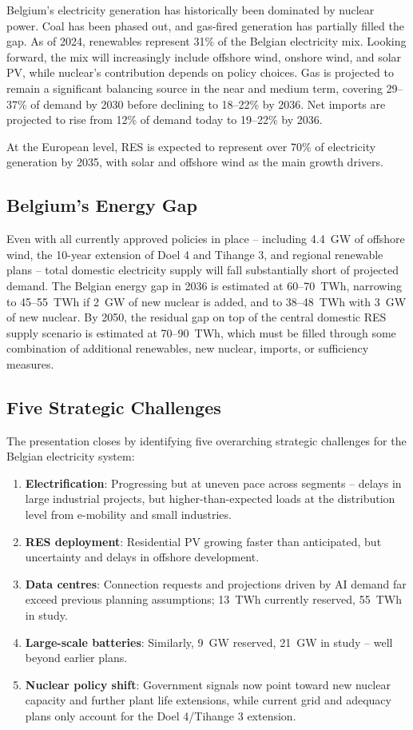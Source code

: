 Belgium's electricity generation has historically been dominated by nuclear power. Coal has been phased out, and gas-fired generation has partially filled the gap. As of 2024, renewables represent 31\% of the Belgian electricity mix. Looking forward, the mix will increasingly include offshore wind, onshore wind, and solar PV, while nuclear's contribution depends on policy choices. Gas is projected to remain a significant balancing source in the near and medium term, covering 29--37\% of demand by 2030 before declining to 18--22\% by 2036. Net imports are projected to rise from 12\% of demand today to 19--22\% by 2036.

At the European level, RES is expected to represent over 70\% of electricity generation by 2035, with solar and offshore wind as the main growth drivers.

\subsection{Belgium's Energy Gap}

Even with all currently approved policies in place -- including 4.4~GW of offshore wind, the 10-year extension of Doel 4 and Tihange 3, and regional renewable plans -- total domestic electricity supply will fall substantially short of projected demand. The Belgian energy gap in 2036 is estimated at 60--70~TWh, narrowing to 45--55~TWh if 2~GW of new nuclear is added, and to 38--48~TWh with 3~GW of new nuclear. By 2050, the residual gap on top of the central domestic RES supply scenario is estimated at 70--90~TWh, which must be filled through some combination of additional renewables, new nuclear, imports, or sufficiency measures.

\subsection{Five Strategic Challenges}

The presentation closes by identifying five overarching strategic challenges for the Belgian electricity system:

\begin{enumerate}[noitemsep]
    \item \textbf{Electrification}: Progressing but at uneven pace across segments -- delays in large industrial projects, but higher-than-expected loads at the distribution level from e-mobility and small industries.
    \item \textbf{RES deployment}: Residential PV growing faster than anticipated, but uncertainty and delays in offshore development.
    \item \textbf{Data centres}: Connection requests and projections driven by AI demand far exceed previous planning assumptions; 13~TWh currently reserved, 55~TWh in study.
    \item \textbf{Large-scale batteries}: Similarly, 9~GW reserved, 21~GW in study -- well beyond earlier plans.
    \item \textbf{Nuclear policy shift}: Government signals now point toward new nuclear capacity and further plant life extensions, while current grid and adequacy plans only account for the Doel 4/Tihange 3 extension.
\end{enumerate}

